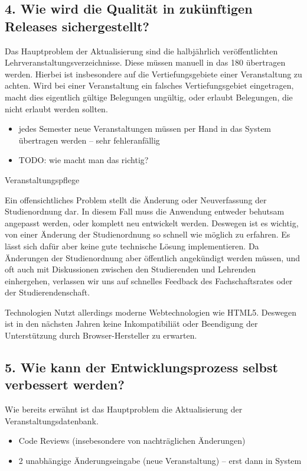 \documentclass[ngerman]{article}
\begin{document}
\subsection{4. Wie wird die Qualität in zukünftigen Releases sichergestellt?}

Das Hauptproblem der Aktualisierung sind die halbjährlich veröffentlichten Lehrveranstaltungsverzeichnisse.
Diese müssen manuell in das 180 übertragen werden.
Hierbei ist insbesondere auf die Vertiefungsgebiete einer Veranstaltung zu achten.
Wird bei einer Veranstaltung ein falsches Vertiefungsgebiet eingetragen, macht dies eigentlich gültige Belegungen ungültig, oder erlaubt Belegungen, die nicht erlaubt werden sollten.

\begin{itemize}
    \item
        jedes Semester neue Veranstaltungen müssen per Hand in das System übertragen werden -- sehr fehleranfällig
    \item
        TODO: wie macht man das richtig?
\end{itemize}

Veranstaltungspflege

Ein offensichtliches Problem stellt die Änderung oder Neuverfassung der
Studienordnung dar. In diesem Fall muss die Anwendung entweder behutsam
angepasst werden, oder komplett neu entwickelt werden. Deswegen ist es
wichtig, von einer Änderung der Studienordnung so schnell wie möglich zu
erfahren. Es lässt sich dafür aber keine gute technische Lösung
implementieren. Da Änderungen der Studienordnung aber öffentlich
angekündigt werden müssen, und oft auch mit Diskussionen zwischen den
Studierenden und Lehrenden einhergehen, verlassen wir uns auf schnelles
Feedback des Fachschaftsrates oder der Studierendenschaft.

Technologien Nutzt allerdings moderne Webtechnologien wie HTML5.
Deswegen ist in den nächsten Jahren keine Inkompatibiliät oder
Beendigung der Unterstützung durch Browser-Hersteller zu erwarten.

\subsection{5. Wie kann der Entwicklungsprozess selbst verbessert werden?}

Wie bereits erwähnt ist das Hauptproblem die Aktualisierung der
Veranstaltungsdatenbank.

\begin{itemize}
    \item
        Code Reviews (insebesondere von nachträglichen Änderungen)
    \item
        2 unabhängige Änderungseingabe (neue Veranstaltung) -- erst dann in System
\end{itemize}
\end{document}
